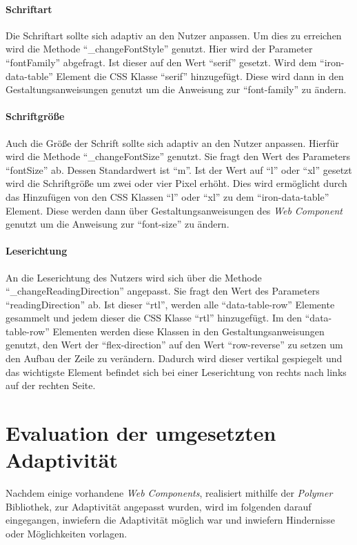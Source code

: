 \documentclass[12pt, paper=a4, bibtotoc, toc=listof, headsepline=true]{scrreprt}
\begin{document}
		\subsubsection{Schriftart}
		Die Schriftart sollte sich adaptiv an den Nutzer anpassen. Um dies zu erreichen wird die Methode \enquote{\_changeFontStyle} genutzt. Hier wird der Parameter \enquote{fontFamily} abgefragt. Ist dieser auf den Wert \enquote{serif} gesetzt. Wird dem \enquote{iron-data-table} Element die CSS Klasse \enquote{serif} hinzugefügt. Diese wird dann in den Gestaltungsanweisungen genutzt um die Anweisung zur \enquote{font-family} zu ändern.
		\subsubsection{Schriftgröße}
		Auch die Größe der Schrift sollte sich adaptiv an den Nutzer anpassen. Hierfür wird die Methode \enquote{\_changeFontSize} genutzt. Sie fragt den Wert des Parameters \enquote{fontSize} ab. Dessen Standardwert ist \enquote{m}. Ist der Wert auf \enquote{l} oder \enquote{xl} gesetzt wird die Schriftgröße um zwei oder vier Pixel erhöht. Dies wird ermöglicht durch das Hinzufügen von den CSS Klassen \enquote{l} oder \enquote{xl} zu dem \enquote{iron-data-table} Element. Diese werden dann über Gestaltungsanweisungen des \emph{Web Component} genutzt um die Anweisung zur \enquote{font-size} zu ändern.
		\subsubsection{Leserichtung}
		An die Leserichtung des Nutzers wird sich über die Methode \enquote{\_changeReadingDirection} angepasst. Sie fragt den Wert des Parameters \enquote{readingDirection} ab. Ist dieser \enquote{rtl}, werden alle \enquote{data-table-row} Elemente gesammelt und jedem dieser die CSS Klasse \enquote{rtl} hinzugefügt. Im den \enquote{data-table-row} Elementen werden diese Klassen in den Gestaltungsanweisungen genutzt, den Wert der \enquote{flex-direction} auf den Wert \enquote{row-reverse} zu setzen um den Aufbau der Zeile zu verändern. Dadurch wird dieser vertikal gespiegelt und das wichtigste Element befindet sich bei einer Leserichtung von rechts nach links auf der rechten Seite.

\chapter{Evaluation der umgesetzten Adaptivität}
Nachdem einige vorhandene \emph{Web Components}, realisiert mithilfe der \emph{Polymer} Bibliothek, zur Adaptivität angepasst wurden, wird im folgenden darauf eingegangen, inwiefern die Adaptivität möglich war und inwiefern Hindernisse oder Möglichkeiten vorlagen.
\end{document}
